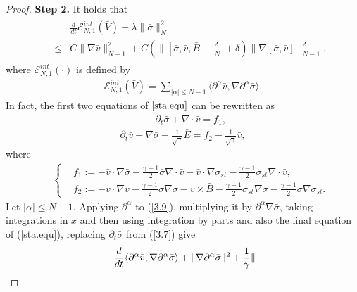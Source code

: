 \documentclass[11pt]{amsart}
\numberwithin{equation}{section}
\begin{document}
\begin{proof}
\textbf{Step 2.} It holds that
\begin{eqnarray}\label{step2}
  &&\begin{aligned}
  &\frac{d}{dt}\mathcal {E}_{N,1}^{int}(\bar{V})+\lambda\|\bar{\sigma}\|^{2}_{N} \\
  \leq & C\|\nabla\bar{v}\|_{N-1}^{2}+C(\|[\bar{\sigma}, \bar{v},\bar{B}]\|_{N}^{2}+\delta)
  \|\nabla[\bar{\sigma},\bar{v}]\|_{N-1}^{2},
  \end{aligned}
\end{eqnarray}
where $\mathcal {E}_{N,1}^{int}(\cdot)$ is defined by
\begin{eqnarray*}
\mathcal {E}_{N,1}^{int}(\bar{V})=\sum_{|\alpha|\leq N-1}\langle
\partial^{\alpha}\bar{v},\nabla\partial^{\alpha}\bar{\sigma}\rangle.
\end{eqnarray*}
In fact, the first two equations of $ \eqref{sta.equ}$ can be
rewritten as
\begin{eqnarray}\label{3.7}
  &&\partial_t \bar{\sigma}+\nabla \cdot \bar{v}=f_{1},
\end{eqnarray}
\begin{eqnarray}\label{3.9}
  \partial_t \bar{v}+\nabla
  \bar{\sigma}+\frac{1}{\sqrt{\gamma}}\bar{E}=f_{2}-\frac{1}{\sqrt{\gamma}}\bar{v},
\end{eqnarray}
where
\begin{eqnarray}\label{f1f2}
 && \left\{
 \begin{aligned}
 & f_{1}:=-\bar{v}\cdot
  \nabla\bar{\sigma}-\frac{\gamma-1}{2}\bar{\sigma}\nabla \cdot \bar{v}
  -\bar{v}\cdot
 \nabla \sigma_{st}-\frac{\gamma-1}{2}\sigma_{st}\nabla \cdot \bar{v},\\
 & f_{2}:=-\bar{v}\cdot \nabla
  \bar{v}-\frac{\gamma-1}{2}\bar{\sigma}\nabla \bar{\sigma}-\bar{v}\times \bar{B}
  -\frac{\gamma-1}{2}\sigma_{st}\nabla \bar{\sigma}-\frac{\gamma-1}{2}\bar{\sigma}\nabla\sigma_{st}.
\end{aligned}\right.
\end{eqnarray}
Let $|\alpha|\leq N-1$. Applying $\partial^{\alpha}$ to (\ref{3.9}),
multiplying it by $\partial^{\alpha}\nabla \bar{\sigma}$, taking
integrations in $x$ and then using integration by parts and also the
final equation of (\ref{sta.equ}), replacing
$\partial_{t}\bar{\sigma}$ from (\ref{3.7}) give
\begin{eqnarray*}
\arraycolsep=1.5pt
\begin{array}{rl}
 &\displaystyle
\frac{d}{dt}\langle
\partial^{\alpha}\bar{v},\nabla
\partial^{\alpha}\bar{\sigma}\rangle
+\|\nabla\partial^{\alpha}\bar{\sigma}\|^{2}+\frac{1}{\gamma}\|

\end{array}
\end{eqnarray*}
\end{proof}
\end{document}
